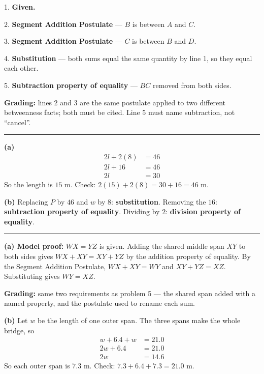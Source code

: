 \documentclass[12pt]{article}
\begin{document}
1. \textbf{Given.}

2. \textbf{Segment Addition Postulate} --- $B$ is between $A$ and $C$.

3. \textbf{Segment Addition Postulate} --- $C$ is between $B$ and $D$.

4. \textbf{Substitution} --- both sums equal the same quantity by line 1, so they equal each other.

5. \textbf{Subtraction property of equality} --- $BC$ removed from both sides.

\textbf{Grading:} lines 2 and 3 are the same postulate applied to two different betweenness facts; both must be cited. Line 5 must name subtraction, not ``cancel''.

\vspace{0.2cm}\noindent\rule{\linewidth}{0.2pt}


\textbf{(a)}
\begin{align*}
  2l + 2(8) &= 46 \\
  2l + 16 &= 46 \\
  2l &= 30
\end{align*}
So the length is $15$ m. Check: $2(15) + 2(8) = 30 + 16 = 46$ m. 

\textbf{(b)} Replacing $P$ by $46$ and $w$ by $8$: \textbf{substitution}. Removing the $16$: \textbf{subtraction property of equality}. Dividing by $2$: \textbf{division property of equality}.

\vspace{0.2cm}\noindent\rule{\linewidth}{0.2pt}


\textbf{(a) Model proof:} $WX = YZ$ is given. Adding the shared middle span $XY$ to both sides gives $WX + XY = XY + YZ$ by the addition property of equality. By the Segment Addition Postulate, $WX + XY = WY$ and $XY + YZ = XZ$. Substituting gives $WY = XZ$.

\textbf{Grading:} same two requirements as problem 5 --- the shared span added with a named property, and the postulate used to rename each sum.

\textbf{(b)} Let $w$ be the length of one outer span. The three spans make the whole bridge, so
\begin{align*}
  w + 6.4 + w &= 21.0 \\
  2w + 6.4 &= 21.0 \\
  2w &= 14.6
\end{align*}
So each outer span is $7.3$ m. Check: $7.3 + 6.4 + 7.3 = 21.0$ m. 
\end{document}
